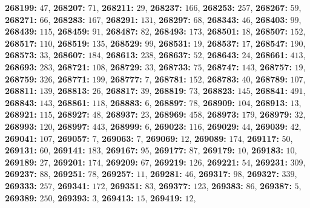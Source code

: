 \textsf{\bfseries 268199:} $47$, \textsf{\bfseries 268207:} $71$, \textsf{\bfseries 268211:} $29$, \textsf{\bfseries 268237:} $166$, \textsf{\bfseries 268253:} $257$, \textsf{\bfseries 268267:} $59$, \textsf{\bfseries 268271:} $66$, \textsf{\bfseries 268283:} $167$, \textsf{\bfseries 268291:} $131$, \textsf{\bfseries 268297:} $68$, \textsf{\bfseries 268343:} $46$, \textsf{\bfseries 268403:} $99$, \textsf{\bfseries 268439:} $115$, \textsf{\bfseries 268459:} $91$, \textsf{\bfseries 268487:} $82$, \textsf{\bfseries 268493:} $173$, \textsf{\bfseries 268501:} $18$, \textsf{\bfseries 268507:} $152$, \textsf{\bfseries 268517:} $110$, \textsf{\bfseries 268519:} $135$, \textsf{\bfseries 268529:} $99$, \textsf{\bfseries 268531:} $19$, \textsf{\bfseries 268537:} $17$, \textsf{\bfseries 268547:} $190$, \textsf{\bfseries 268573:} $33$, \textsf{\bfseries 268607:} $184$, \textsf{\bfseries 268613:} $238$, \textsf{\bfseries 268637:} $52$, \textsf{\bfseries 268643:} $24$, \textsf{\bfseries 268661:} $413$, \textsf{\bfseries 268693:} $283$, \textsf{\bfseries 268721:} $108$, \textsf{\bfseries 268729:} $33$, \textsf{\bfseries 268733:} $75$, \textsf{\bfseries 268747:} $143$, \textsf{\bfseries 268757:} $19$, \textsf{\bfseries 268759:} $326$, \textsf{\bfseries 268771:} $199$, \textsf{\bfseries 268777:} $7$, \textsf{\bfseries 268781:} $152$, \textsf{\bfseries 268783:} $40$, \textsf{\bfseries 268789:} $107$, \textsf{\bfseries 268811:} $139$, \textsf{\bfseries 268813:} $26$, \textsf{\bfseries 268817:} $39$, \textsf{\bfseries 268819:} $73$, \textsf{\bfseries 268823:} $145$, \textsf{\bfseries 268841:} $491$, \textsf{\bfseries 268843:} $143$, \textsf{\bfseries 268861:} $118$, \textsf{\bfseries 268883:} $6$, \textsf{\bfseries 268897:} $78$, \textsf{\bfseries 268909:} $104$, \textsf{\bfseries 268913:} $13$, \textsf{\bfseries 268921:} $115$, \textsf{\bfseries 268927:} $48$, \textsf{\bfseries 268937:} $23$, \textsf{\bfseries 268969:} $458$, \textsf{\bfseries 268973:} $179$, \textsf{\bfseries 268979:} $32$, \textsf{\bfseries 268993:} $120$, \textsf{\bfseries 268997:} $443$, \textsf{\bfseries 268999:} $6$, \textsf{\bfseries 269023:} $116$, \textsf{\bfseries 269029:} $44$, \textsf{\bfseries 269039:} $42$, \textsf{\bfseries 269041:} $107$, \textsf{\bfseries 269057:} $7$, \textsf{\bfseries 269063:} $7$, \textsf{\bfseries 269069:} $12$, \textsf{\bfseries 269089:} $174$, \textsf{\bfseries 269117:} $50$, \textsf{\bfseries 269131:} $60$, \textsf{\bfseries 269141:} $183$, \textsf{\bfseries 269167:} $95$, \textsf{\bfseries 269177:} $87$, \textsf{\bfseries 269179:} $10$, \textsf{\bfseries 269183:} $10$, \textsf{\bfseries 269189:} $27$, \textsf{\bfseries 269201:} $174$, \textsf{\bfseries 269209:} $67$, \textsf{\bfseries 269219:} $126$, \textsf{\bfseries 269221:} $54$, \textsf{\bfseries 269231:} $309$, \textsf{\bfseries 269237:} $88$, \textsf{\bfseries 269251:} $78$, \textsf{\bfseries 269257:} $11$, \textsf{\bfseries 269281:} $46$, \textsf{\bfseries 269317:} $98$, \textsf{\bfseries 269327:} $339$, \textsf{\bfseries 269333:} $257$, \textsf{\bfseries 269341:} $172$, \textsf{\bfseries 269351:} $83$, \textsf{\bfseries 269377:} $123$, \textsf{\bfseries 269383:} $86$, \textsf{\bfseries 269387:} $5$, \textsf{\bfseries 269389:} $250$, \textsf{\bfseries 269393:} $3$, \textsf{\bfseries 269413:} $15$, \textsf{\bfseries 269419:} $12$, 
